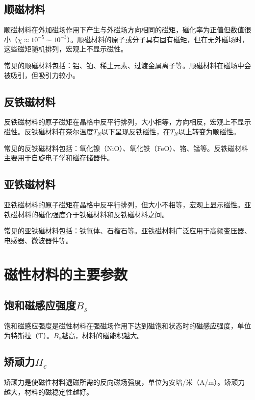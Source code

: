 \documentclass[12pt,UTF8]{ctexbook}
\begin{document}
\subsection{顺磁材料}

顺磁材料在外加磁场作用下产生与外磁场方向相同的磁矩，磁化率为正值但数值很小（$\chi \approx 10^{-5} \sim 10^{-3}$）。顺磁材料的原子或分子具有固有磁矩，但在无外磁场时，这些磁矩随机排列，宏观上不显示磁性。

常见的顺磁材料包括：铝、铂、稀土元素、过渡金属离子等。顺磁材料在磁场中会被吸引，但吸引力较小。

\subsection{反铁磁材料}

反铁磁材料的原子磁矩在晶格中反平行排列，大小相等，方向相反，宏观上不显示磁性。反铁磁材料在奈尔温度$T_N$以下呈现反铁磁性，在$T_N$以上转变为顺磁性。

常见的反铁磁材料包括：氧化镍（NiO）、氧化铁（FeO）、铬、锰等。反铁磁材料主要用于自旋电子学和磁存储器件。

\subsection{亚铁磁材料}

亚铁磁材料的原子磁矩在晶格中反平行排列，但大小不相等，宏观上显示磁性。亚铁磁材料的磁化强度介于铁磁材料和反铁磁材料之间。

常见的亚铁磁材料包括：铁氧体、石榴石等。亚铁磁材料广泛应用于高频变压器、电感器、微波器件等。

\section{磁性材料的主要参数}

\subsection{饱和磁感应强度$B_s$}

饱和磁感应强度是磁性材料在强磁场作用下达到磁饱和状态时的磁感应强度，单位为特斯拉（T）。$B_s$越高，材料的磁能积越大。

\subsection{矫顽力$H_c$}

矫顽力是使磁性材料退磁所需的反向磁场强度，单位为安培/米（A/m）。矫顽力越大，材料的磁稳定性越好。
\end{document}

